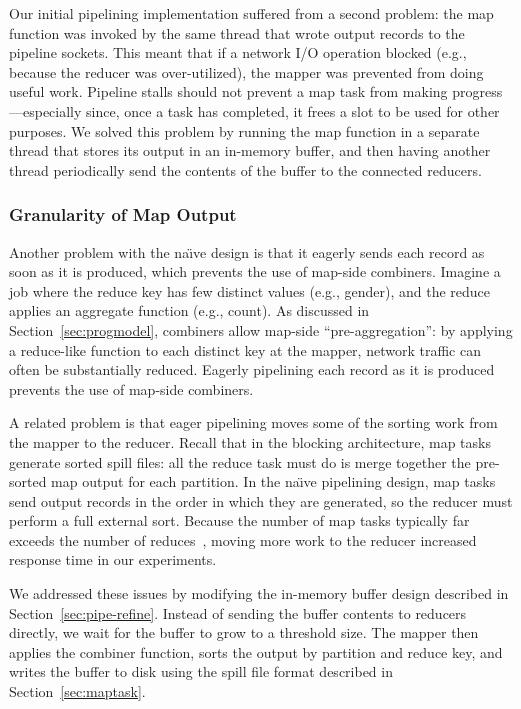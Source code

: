 Our initial pipelining implementation suffered from a second problem: the map
function was invoked by the same thread that wrote output records to the
pipeline sockets. This meant that if a network I/O operation blocked (e.g.,
because the reducer was over-utilized), the mapper was prevented from doing
useful work. Pipeline stalls should not prevent a map task from making
progress---especially since, once a task has completed, it frees a {\TT} slot
to be used for other purposes. We solved this problem by running the map
function in a separate thread that stores its output in an in-memory buffer, and
then having another thread periodically send the contents of the buffer to the
connected reducers.

\subsubsection{Granularity of Map Output}
\label{sec:mapout}

Another problem with the na\"{\i}ve design is that it eagerly sends
each record as soon as it is produced, which prevents the use of
map-side combiners. Imagine a job where the reduce key has few
distinct values (e.g., gender), and the reduce applies an aggregate
function (e.g., count). As discussed in Section~\ref{sec:progmodel},
combiners allow map-side ``pre-aggregation'': by applying a
reduce-like function to each distinct key at the mapper, network
traffic can often be substantially reduced. Eagerly pipelining each
record as it is produced prevents the use of map-side combiners.

A related problem is that eager pipelining moves some of the sorting
work from the mapper to the reducer. Recall that in the blocking
architecture, map tasks generate sorted spill files: all the reduce
task must do is merge together the pre-sorted map output for each
partition. In the na\"{\i}ve pipelining design, map tasks send output
records in the order in which they are generated, so the reducer must
perform a full external sort. Because the number of map tasks
typically far exceeds the number of reduces~\cite{mapreduce-osdi},
moving more work to the reducer increased response time in our
experiments.

We addressed these issues by modifying the in-memory buffer design described in
Section~\ref{sec:pipe-refine}. Instead of sending the buffer contents to
reducers directly, we wait for the buffer to grow to a threshold
size. The mapper then applies the combiner function, sorts the output by
partition and reduce key, and writes the buffer to disk using the spill file
format described in Section~\ref{sec:maptask}.

